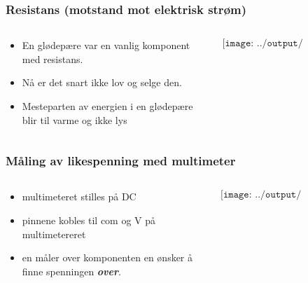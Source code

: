 \documentclass[aspectratio=169,xcolor=dvipsnames]{beamer}
\begin{document}
\begin{frame}
	\frametitle{Resistans (motstand mot elektrisk strøm)}

	\begin{columns}
		\begin{column}{0.5\textwidth}
			\begin{itemize}
				\item En glødepære var en vanlig komponent med resistans. 
				\item Nå er det snart ikke lov og selge den. 
				\item Mesteparten av energien i en glødepære blir til varme og ikke lys
			\end{itemize}
		\end{column}

		\begin{column}{0.5\textwidth}
			$$\texttt{[image: ../output/noGPLimages/tifel14.png]}$$
		\end{column}
	\end{columns}
\end{frame}

\begin{frame}
	\frametitle{Måling av likespenning med multimeter}

	\begin{columns}
		\begin{column}{0.3\textwidth}
			\begin{itemize}
				\item multimeteret stilles på DC
				\item pinnene kobles til com og V på multimetereret 
				\item en måler over komponenten en ønsker å finne spenningen \textbf{\textit{over}}. 
			\end{itemize}
		\end{column}

		\begin{column}{0.7\textwidth}
			$$\texttt{[image: ../output/noGPLimages/tifel15.png]}$$
		\end{column}
	\end{columns}
\end{frame}
\end{document}
